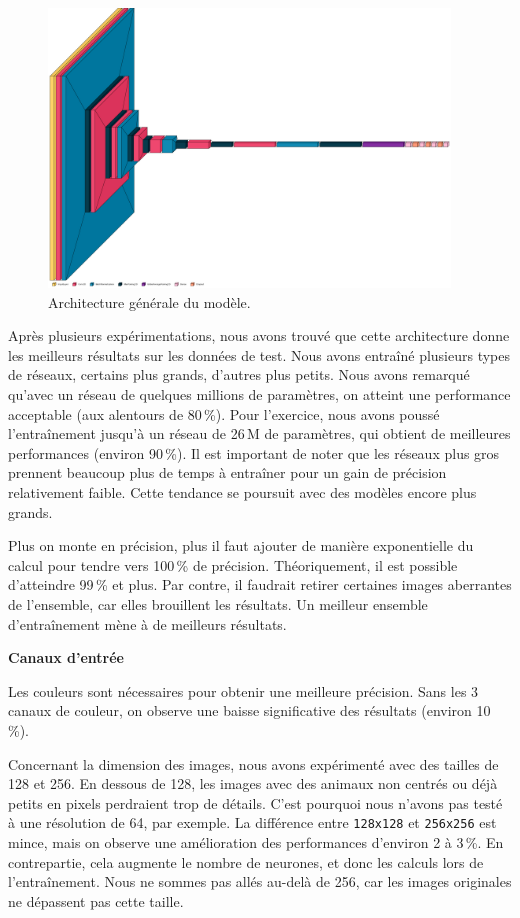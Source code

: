 \documentclass{article}
\begin{document}
\begin{figure}[H]
    \centering
    \includegraphics[width=0.95\textwidth]{assets/model_architecture.png}
    \caption{Architecture générale du modèle.}
\end{figure}

Après plusieurs expérimentations, nous avons trouvé que cette architecture donne les meilleurs résultats sur les données de test. Nous avons entraîné plusieurs types de réseaux, certains plus grands, d'autres plus petits. Nous avons remarqué qu’avec un réseau de quelques millions de paramètres, on atteint une performance acceptable (aux alentours de 80\,\%). Pour l’exercice, nous avons poussé l’entraînement jusqu’à un réseau de 26\,M de paramètres, qui obtient de meilleures performances (environ 90\,\%). Il est important de noter que les réseaux plus gros prennent beaucoup plus de temps à entraîner pour un gain de précision relativement faible. Cette tendance se poursuit avec des modèles encore plus grands.

Plus on monte en précision, plus il faut ajouter de manière exponentielle du calcul pour tendre vers 100\,\% de précision. Théoriquement, il est possible d’atteindre 99\,\% et plus. Par contre, il faudrait retirer certaines images aberrantes de l’ensemble, car elles brouillent les résultats. Un meilleur ensemble d’entraînement mène à de meilleurs résultats.

\textbf{Canaux d’entrée}

Les couleurs sont nécessaires pour obtenir une meilleure précision. Sans les 3 canaux de couleur, on observe une baisse significative des résultats (environ 10\,\%).

Concernant la dimension des images, nous avons expérimenté avec des tailles de 128 et 256. En dessous de 128, les images avec des animaux non centrés ou déjà petits en pixels perdraient trop de détails. C’est pourquoi nous n’avons pas testé à une résolution de 64, par exemple. La différence entre \texttt{128x128} et \texttt{256x256} est mince, mais on observe une amélioration des performances d’environ 2 à 3\,\%. En contrepartie, cela augmente le nombre de neurones, et donc les calculs lors de l’entraînement. Nous ne sommes pas allés au-delà de 256, car les images originales ne dépassent pas cette taille.
\end{document}

